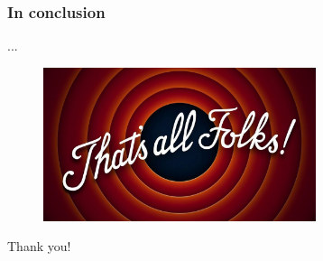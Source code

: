 \documentclass{beamer}
\begin{document}
\begin{frame}
  \frametitle{In conclusion}
  ...
\end{frame}
\begin{frame}

  \begin{figure}[t]
    \includegraphics[width=8cm]{images/ending.png}
    \centering
    \end{figure}

    \vspace{0.2cm}


  \begin{center}
    \begin{Large}
      Thank you!
    \end{Large}
  \end{center}
    
\end{frame}
\end{document}
